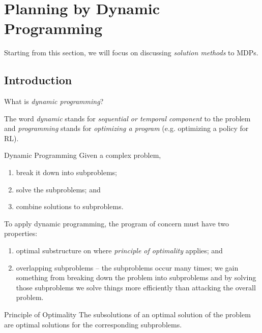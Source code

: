 \documentclass[RL]{subfiles}
\begin{document}
    \section{Planning by Dynamic Programming}

    Starting from this section, we will focus on discussing \textit{solution methods} to MDPs.

    \subsection{Introduction}

    What is \textit{dynamic programming}?

    The word \textit{dynamic} stands for \textit{sequential or temporal component} to the problem and \textit{programming} stands for \textit{optimizing a program} (e.g. optimizing a policy for RL).

    \begin{boxy}{\stfont Dynamic Programming}
        Given a complex problem,
        \begin{enumerate}
            \item break it down into subproblems;
            \item solve the subproblems; and
            \item combine solutions to subproblems.
        \end{enumerate}
    \end{boxy}

    \np To apply dynamic programming, the program of concern must have two properties: 
    \begin{enumerate}
        \item optimal substructure on where \textit{principle of optimality} applies; and
        \item overlapping subproblems -- the subproblems occur many times; we gain something from breaking down the problem into subproblems and by solving those subproblems we solve things more efficiently than attacking the overall problem.
    \end{enumerate}

    \begin{statement}{Principle of Optimality}
        The subsolutions of an optimal solution of the problem are optimal solutions for the corresponding subproblems.
    \end{statement}

    \rruleline
    
\end{document}
